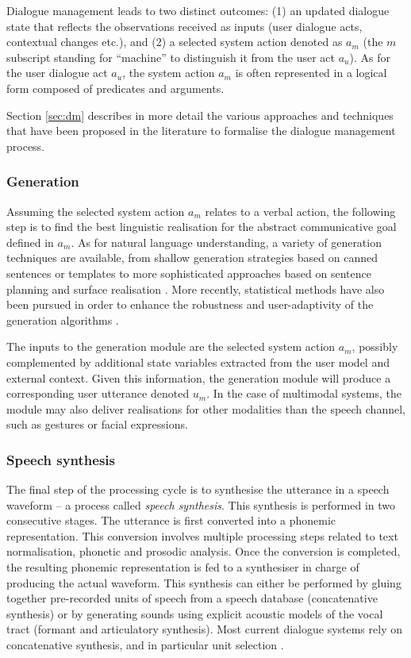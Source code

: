 Dialogue management leads to two distinct outcomes: (1) an updated dialogue state that reflects the observations received as inputs (user dialogue acts, contextual changes etc.), and (2) a selected system action denoted as $a_m$ (the $m$ subscript standing for ``machine'' to distinguish it from the user act $a_u$).  As for the user dialogue act $a_u$, the system action $a_m$ is often represented in a logical form composed of predicates and arguments. 

Section \ref{sec:dm} describes in more detail the various approaches and techniques that have been proposed in the literature to formalise the dialogue management process. 

\subsubsection*{Generation}
Assuming the selected system action $a_m$ relates to a verbal action, the following step is to find the best linguistic realisation for the abstract communicative goal defined in $a_m$.  As for natural language understanding, a variety of generation techniques are available, from shallow generation strategies based on canned sentences or templates to more sophisticated approaches based on sentence planning and surface realisation \citep{Stone2003,koller-stone:2007}.  More recently, statistical methods have also been pursued in order to enhance the robustness and user-adaptivity of the generation algorithms \citep{Rieser:2010,DethlefsC11}. 

The inputs to the generation module are the selected system action $a_m$, possibly complemented by additional state variables extracted from the user model and external context. Given this information, the generation module will produce a corresponding user utterance denoted $u_m$.  In the case of multimodal systems, the module may also deliver realisations for other modalities than the speech channel, such as gestures or facial expressions.

\subsubsection*{Speech synthesis}
The final step of the processing cycle is to synthesise the utterance in a speech waveform --  a process called \textit{speech synthesis}.  This synthesis is performed in two consecutive stages.  The utterance is first converted into a phonemic representation. This conversion involves multiple processing steps related to text normalisation, phonetic and prosodic analysis.  Once the conversion is completed, the resulting phonemic representation is fed to a synthesiser in charge of producing the actual waveform. This synthesis can either be performed by gluing together pre-recorded units of speech from a speech database (concatenative synthesis) or by generating sounds using explicit acoustic models of the vocal tract (formant and articulatory synthesis). Most current dialogue systems rely on concatenative synthesis, and in particular unit selection \citep{hunt1996}. 


